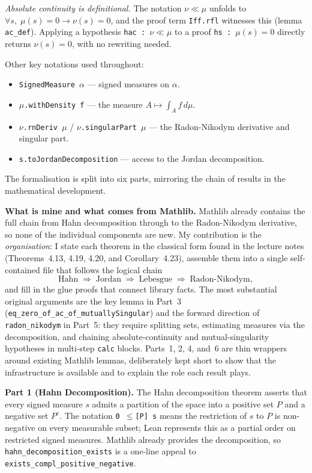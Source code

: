 \documentclass[11pt]{article}
\begin{document}
\emph{Absolute continuity is definitional.} The notation $\nu \ll \mu$ unfolds to $\forall s,\; \mu(s) = 0 \to \nu(s) = 0$, and the proof term \texttt{Iff.rfl} witnesses this (lemma \texttt{ac\_def}). Applying a hypothesis \texttt{hac~:~$\nu \ll \mu$} to a proof \texttt{hs~:~$\mu(s) = 0$} directly returns $\nu(s) = 0$, with no rewriting needed.

Other key notations used throughout:
\begin{itemize}
\item \texttt{SignedMeasure $\alpha$} --- signed measures on $\alpha$.
\item \texttt{$\mu$.withDensity f} --- the measure $A\mapsto\int_A f\,d\mu$.
\item \texttt{$\nu$.rnDeriv $\mu$} / \texttt{$\nu$.singularPart $\mu$} --- the Radon-Nikodym derivative and singular part.
\item \texttt{s.toJordanDecomposition} --- access to the Jordan decomposition.
\end{itemize}

The formalisation is split into six parts, mirroring the chain of results in the mathematical development.

\medskip
\noindent
\textbf{What is mine and what comes from Mathlib.}
Mathlib already contains the full chain from Hahn decomposition through to the Radon-Nikodym derivative, so none of the individual components are new. My contribution is the \emph{organisation}: I state each theorem in the classical form found in the lecture notes (Theorems~4.13, 4.19, 4.20, and Corollary~4.23), assemble them into a single self-contained file that follows the logical chain
\[
\text{Hahn} \;\Rightarrow\; \text{Jordan} \;\Rightarrow\; \text{Lebesgue} \;\Rightarrow\; \text{Radon-Nikodym},
\]
and fill in the glue proofs that connect library facts. The most substantial original arguments are the key lemma in Part~3 (\texttt{eq\_zero\_of\_ac\_of\_mutually\-Singular}) and the forward direction of \texttt{radon\_nikodym} in Part~5: they require splitting sets, estimating measures via the decomposition, and chaining absolute-continuity and mutual-singularity hypotheses in multi-step \texttt{calc} blocks. Parts~1, 2, 4, and~6 are thin wrappers around existing Mathlib lemmas, deliberately kept short to show that the infrastructure is available and to explain the role each result plays.

\medskip
\noindent
\textbf{Part 1 (Hahn Decomposition).}
The Hahn decomposition theorem asserts that every signed measure $s$ admits a partition of the space into a positive set $P$ and a negative set $P^c$. The notation \texttt{0~$\le$[P]~s} means the restriction of $s$ to $P$ is non-negative on every measurable subset; Lean represents this as a partial order on restricted signed measures. Mathlib already provides the decomposition, so \verb|hahn_decomposition_exists| is a one-line appeal to \texttt{exists\_compl\_positive\_negative}.
\end{document}
